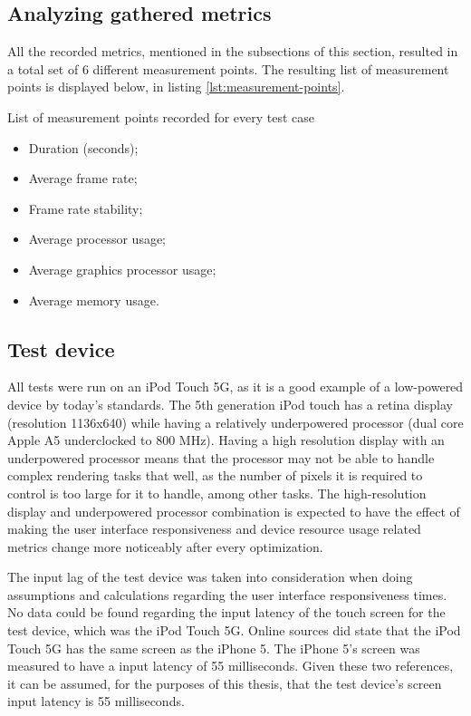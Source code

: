 \documentclass[a4paper,12pt]{article}
\begin{document}
\subsection{Analyzing gathered metrics}
All the recorded metrics, mentioned in the subsections of this section, resulted in a total set of 6 different measurement points. The resulting list of measurement points is displayed below, in listing \autoref{lst:measurement-points}.

\begin{listing}[H]
  \caption{List of measurement points recorded for every test case}
  \label{lst:measurement-points}
  \begin{itemize}
    \item Duration (seconds);
    \item Average frame rate;
    \item Frame rate stability;
    \item Average processor usage;
    \item Average graphics processor usage;
    \item Average memory usage.
  \end{itemize}
\end{listing}

\subsection{Test device}
\label{subsec:test-device}
All tests were run on an iPod Touch 5G, as it is a good example of a low-powered device by today's standards. The 5th generation iPod touch has a retina display (resolution 1136x640)\cite{AppleIPodTouch5G} while having a relatively underpowered \cite{IPhoneVsIPod5} processor (dual core Apple A5 underclocked to 800 MHz)\cite{MacObserverUnderclock}. Having a high resolution display with an underpowered processor means that the processor may not be able to handle complex rendering tasks that well, as the number of pixels it is required to control is too large for it to handle, among other tasks.\cite{RetinaAndWeakProcessor} The high-resolution display and underpowered processor combination is expected to have the effect of making the user interface responsiveness and device resource usage related metrics change more noticeably after every optimization.

The input lag of the test device was taken into consideration when doing assumptions and calculations regarding the user interface responsiveness times. No data could be found regarding the input latency of the touch screen for the test device, which was the iPod Touch 5G. Online sources did state that the iPod Touch 5G has the same screen as the iPhone 5\cite{Iphone5SameDisplayAs5G}. The iPhone 5's screen was measured to have a input latency of 55 milliseconds.\cite{IPhoneInputLag} Given these two references, it can be assumed, for the purposes of this thesis, that the test device's screen input latency is 55 milliseconds.
\end{document}
